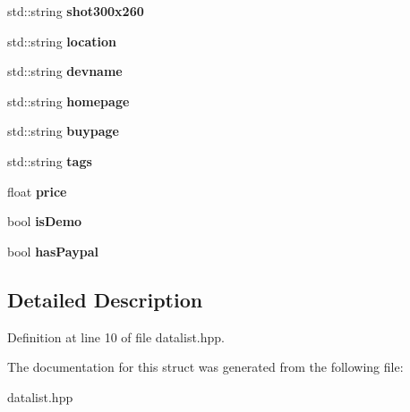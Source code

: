 \begin{DoxyCompactItemize}
\item 
\hypertarget{struct_data_list_1_1_tig_info_af875f159d24f61fb3056ed158297829f}{std\-::string {\bfseries shot300x260}}\label{struct_data_list_1_1_tig_info_af875f159d24f61fb3056ed158297829f}

\item 
\hypertarget{struct_data_list_1_1_tig_info_aa4ddff451d3819ff6bddc181b7fa2b1f}{std\-::string {\bfseries location}}\label{struct_data_list_1_1_tig_info_aa4ddff451d3819ff6bddc181b7fa2b1f}

\item 
\hypertarget{struct_data_list_1_1_tig_info_a10f9dcc8107bb4739387753e2920485f}{std\-::string {\bfseries devname}}\label{struct_data_list_1_1_tig_info_a10f9dcc8107bb4739387753e2920485f}

\item 
\hypertarget{struct_data_list_1_1_tig_info_a24b8d1bf789b800811db2d40ce73ae5d}{std\-::string {\bfseries homepage}}\label{struct_data_list_1_1_tig_info_a24b8d1bf789b800811db2d40ce73ae5d}

\item 
\hypertarget{struct_data_list_1_1_tig_info_a48d3394960e1555e2b59d123c2f79da6}{std\-::string {\bfseries buypage}}\label{struct_data_list_1_1_tig_info_a48d3394960e1555e2b59d123c2f79da6}

\item 
\hypertarget{struct_data_list_1_1_tig_info_a9723b66f1c66923e54a1f0a14ed287a9}{std\-::string {\bfseries tags}}\label{struct_data_list_1_1_tig_info_a9723b66f1c66923e54a1f0a14ed287a9}

\item 
\hypertarget{struct_data_list_1_1_tig_info_a302ea5a3bb49ec1cbd2524e831dd6d65}{float {\bfseries price}}\label{struct_data_list_1_1_tig_info_a302ea5a3bb49ec1cbd2524e831dd6d65}

\item 
\hypertarget{struct_data_list_1_1_tig_info_a7b3d322dc58e9319e46cb65af660a61c}{bool {\bfseries is\-Demo}}\label{struct_data_list_1_1_tig_info_a7b3d322dc58e9319e46cb65af660a61c}

\item 
\hypertarget{struct_data_list_1_1_tig_info_af8fc507248040cfd567ed0492f42bf6e}{bool {\bfseries has\-Paypal}}\label{struct_data_list_1_1_tig_info_af8fc507248040cfd567ed0492f42bf6e}

\end{DoxyCompactItemize}


\subsection{Detailed Description}


Definition at line 10 of file datalist.\-hpp.



The documentation for this struct was generated from the following file\-:\begin{DoxyCompactItemize}
\item 
datalist.\-hpp\end{DoxyCompactItemize}
